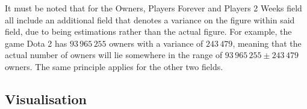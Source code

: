 \documentclass[dataset.tex]{subfiles}
\begin{document}
It must be noted that for the Owners, Players Forever and Players 2 Weeks field
all include an additional field that denotes a variance on the figure within
said field, due to being estimations rather than the actual figure. For example,
the game Dota 2 has \(93\,965\,255\) owners with a variance of \(243\,479\),
meaning that the actual number of owners will lie somewhere in the range of
\(93\,965\,255 \pm 243\,479 \) owners. The same principle applies for the other
two fields.

\subsection{Visualisation} %
\label{sub:visualisation}

\end{document}

